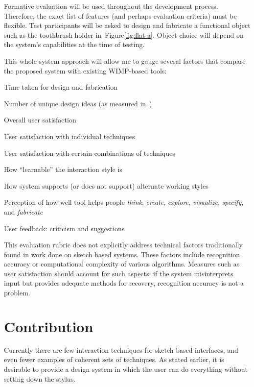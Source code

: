 \documentclass[12pt]{article}
\newenvironment{packed_enum}{
\begin{enumerate}
  \setlength{\itemsep}{1pt}
  \setlength{\parskip}{0pt}
  \setlength{\parsep}{0pt}
}{\end{enumerate}}
\begin{document}
Formative evaluation will be used throughout the development
process. Therefore, the exact list of features (and perhaps evaluation
criteria) must be flexible. Test participants will be asked to design
and fabricate a functional object such as the toothbrush holder
in~Figure\ref{fig:flat-a}. Object choice will depend on the system's
capabilities at the time of testing. 

This whole-system approach will allow me to gauge several factors that
compare the proposed system with existing WIMP-based tools:

\begin{packed_enum}
\item Time taken for design and fabrication
\item Number of unique design ideas (as measured
  in~\cite{goel-sketches-of-thought})
\item Overall user satisfaction
\item User satisfaction with individual techniques
\item User satisfaction with certain combinations of techniques
\item How ``learnable'' the interaction style is
\item How system supports (or does not support) alternate working
  styles
\item Perception of how well tool helps people \textit{think},
  \textit{create}, \textit{explore}, \textit{visualize},
  \textit{specify}, and \textit{fabricate}
\item User feedback: criticism and suggestions
\end{packed_enum}

This evaluation rubric does not explicitly address technical factors
traditionally found in work done on sketch based systems. These
factors include recognition accuracy or computational complexity of
various algorithms. Measures such as user satisfaction should account
for such aspects: if the system misinterprets input but provides
adequate methods for recovery, recognition accuracy is not a problem.

\section{Contribution}

Currently there are few interaction techniques for sketch-based
interfaces, and even fewer examples of coherent sets of techniques. As
stated earlier, it is desirable to provide a design system in which
the user can do everything without setting down the stylus.
\end{document}
